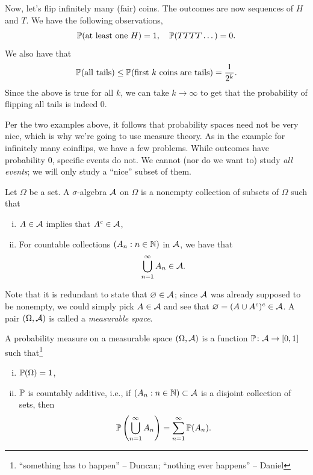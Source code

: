 \begin{example}
    Now, let's flip infinitely many (fair) coins. The outcomes are now sequences of $H$ and $T$. We have the following observations,
    \[ \mathbb P(\text{at least one } H) = 1, \quad \mathbb P(TTTT\dots) = 0. \]
    We also have that
    \[ \mathbb P(\text{all tails}) \leq \mathbb P(\text{first $k$ coins are tails}) = \frac{1}{2^k}. \]
    Since the above is true for all $k$, we can take $k \to \infty$ to get that the probability of flipping all tails is indeed $0$.
\end{example}

Per the two examples above, it follows that probability spaces need not be very nice, which is why we're going to use measure theory. As in the example for infinitely many coinflips, we have a few problems. While outcomes have probability $0$, specific events do not. We cannot (nor do we want to) study \textit{all events}; we will only study a ``nice'' subset of them.
\begin{definition} \label{defn:sigma_algebra}
    Let $\Omega$ be a set. A $\sigma$-algebra $\mathcal A$ on $\Omega$ is a nonempty collection of subsets of $\Omega$ such that
    \begin{enumerate}[(i)]
        \item $A \in \mathcal A$ implies that $A^c \in \mathcal A$,
        \item For countable collections $(A_n : n \in \mathbb N)$ in $\mathcal A$, we have that
        \[ \bigcup_{n=1}^\infty A_n \in \mathcal A. \]
    \end{enumerate}
\end{definition}
Note that it is redundant to state that $\varnothing \in \mathcal A$; since $\mathcal A$ was already supposed to be nonempty, we could simply pick $A \in \mathcal A$ and see that $\varnothing = (A \cup A^c)^c \in \mathcal A$. A pair $(\Omega, \mathcal A)$ is called a \textit{measurable space}.

\begin{definition} \label{defn:probability_measure}
    A probability measure on a measurable space $(\Omega, \mathcal A)$ is a function $\mathbb P \colon \mathcal A \to [0, 1]$ such that\footnote{``something has to happen'' -- Duncan; ``nothing ever happens'' -- Daniel}
    \begin{enumerate}[(i)]
        \item $\mathbb P(\Omega) = 1$,
        \item $\mathbb P$ is countably additive, i.e., if $(A_n : n \in \mathbb N) \subset \mathcal A$ is a disjoint collection of sets, then
        \[ \mathbb P \left(\bigcup_{n=1}^\infty A_n\right) = \sum_{n=1}^\infty \mathbb P(A_n). \]
    \end{enumerate}
\end{definition}

